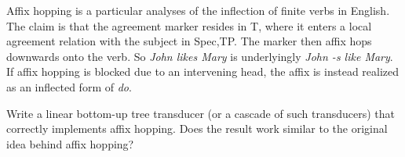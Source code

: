 \begin{exercise}
    Affix hopping is a particular analyses of the inflection of finite verbs in English.
    The claim is that the agreement marker resides in T, where it enters a local agreement relation with the subject in Spec,TP.\@
    The marker then affix hops downwards onto the verb.
    So \emph{John likes Mary} is underlyingly \emph{John -s like Mary}.
    If affix hopping is blocked due to an intervening head, the affix is instead realized as an inflected form of \emph{do}.
    \begin{exe}
        \ex
        \begin{xlist}
        \end{xlist}
    \end{exe}
    Write a linear bottom-up tree transducer (or a cascade of such transducers) that correctly implements affix hopping.
    Does the result work similar to the original idea behind affix hopping?
\end{exercise}
